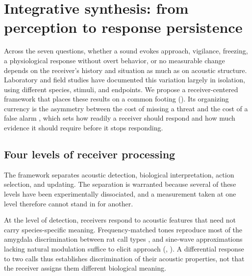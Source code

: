 \section{Integrative synthesis: from perception to response persistence}
\label{sec:synthesis}


Across the seven questions, whether a sound evokes approach, vigilance, freezing, a physiological response without overt behavior, or no measurable change depends on the receiver's history and situation as much as on acoustic structure. Laboratory and field studies have documented this variation largely in isolation, using different species, stimuli, and endpoints. We propose a receiver-centered framework that places these results on a common footing (). Its organizing currency is the asymmetry between the cost of missing a threat and the cost of a false alarm \citep{Nesse2005}, which sets how readily a receiver should respond and how much evidence it should require before it stops responding.

\subsection{Four levels of receiver processing}
\label{sec:synthesis-levels}

The framework separates acoustic detection, biological interpretation, action selection, and updating. The separation is warranted because several of these levels have been experimentally dissociated, and a measurement taken at one level therefore cannot stand in for another.

At the level of detection, receivers respond to acoustic features that need not carry species-specific meaning. Frequency-matched tones reproduce most of the amygdala discrimination between rat call types \citep{ParsanaEtAl2012a}, and sine-wave approximations lacking natural modulation suffice to elicit approach \citep{WohrSchwarting2007} (, ). A differential response to two calls thus establishes discrimination of their acoustic properties, not that the receiver assigns them different biological meaning.

